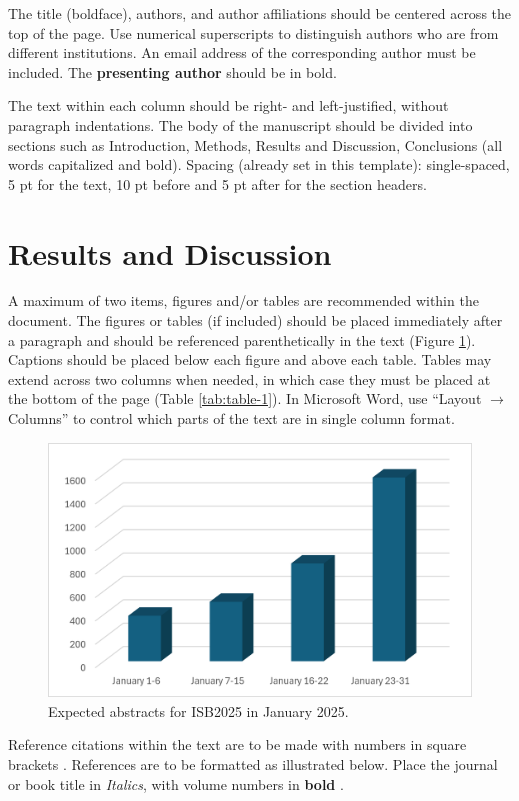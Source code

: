 \documentclass[10pt, a4paper, twocolumn]{article}
\begin{document}
The title (boldface), authors, and author affiliations should be centered across the top of the page. Use numerical superscripts to distinguish authors who are from different institutions. An email address of the corresponding author must be included. The \textbf{presenting author} should be in bold.

The text within each column should be right- and left-justified, without paragraph indentations. The body of the manuscript should be divided into sections such as Introduction, Methods, Results and Discussion, Conclusions (all words capitalized and bold). Spacing (already set in this template): single-spaced, 5 pt for the text, 10 pt before and 5 pt after for the section headers.

\section*{Results and Discussion}
A maximum of two items, figures and/or tables are recommended within the document. The figures or tables (if included) should be placed immediately after a paragraph and should be referenced parenthetically in the text (Figure \ref{fig:expected-abstracts}). Captions should be placed below each figure and above each table. Tables may extend across two columns when needed, in which case they must be placed at the bottom of the page (Table \ref{tab:table-1}). In Microsoft Word, use “Layout $\rightarrow$ Columns” to control which parts of the text are in single column format.
\begin{figure}[H]
    \centering
    \includegraphics[width=\linewidth]{isb-figure.png} %
    \caption{Expected abstracts for ISB2025 in January 2025.}
    \label{fig:expected-abstracts}
\end{figure}
Reference citations within the text are to be made with numbers in square brackets \cite{author2023, someauthor2023}. References are to be formatted as illustrated below. Place the journal or book title in \textit{Italics}, with volume numbers in \textbf{bold} \cite{author2023b}. 
\end{document}
